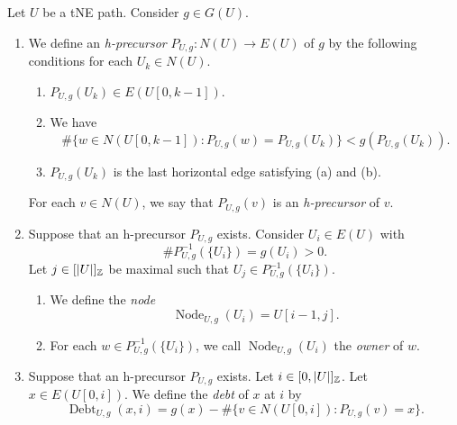 \begin{definition}\label{def:stack}
Let $U$ be a tNE path.
Consider $g\in G(U)$.
\begin{enumerate}[font=\itshape]
\item\label{d:grading-assignment} We define an \textit{h-precursor}
$P_{U,g}\colon N(U)\to E(U)$ of $g$ by the following conditions
for each $U_k\in N(U)$.
\begin{enumerate}[label=(\alph*),font=\itshape]
\item $P_{U,g}(U_k)\in E(U[0,k-1])$.
\item We have
\[
 \#\{w\in N(U[0,k-1]):P_{U,g}(w)=P_{U,g}(U_k)\}<g(P_{U,g}(U_k)).
\]
\item $P_{U,g}(U_k)$ is the last horizontal edge satisfying (a) and (b).
\end{enumerate}
For each $v\in N(U)$, we say that $P_{U,g}(v)$ is an
\textit{h-precursor} of $v$.
\item Suppose that an h-precursor $P_{U,g}$ exists.
Consider $U_i\in E(U)$ with
\[
 \#P_{U,g}^{-1}(\{U_i\})=g(U_i)>0.
\]
Let $j\in[|U|]_{\mathbb Z}$ be maximal such that
$U_j\in P_{U,g}^{-1}(\{U_i\})$.
\begin{enumerate}[label=(\alph*),font=\itshape]
\item We define the \textit{node}
\[
 \operatorname{Node}_{U,g}(U_i)=U[i-1,j].
\]
\item For each $w\in P_{U,g}^{-1}(\{U_i\})$, we call $\operatorname{Node}_{U,g}(U_i)$
the \textit{owner} of $w$.
\end{enumerate}
\item Suppose that an h-precursor $P_{U,g}$ exists.
Let $i\in[0,|U|]_{\mathbb Z}$. Let $x\in E(U[0,i])$.
We define the \textit{debt} of $x$ at $i$ by
\[
 \operatorname{Debt}_{U,g}(x,i)=g(x)-\#\{v\in N(U[0,i]):P_{U,g}(v)=x\}.
\]
\end{enumerate}
\end{definition}

